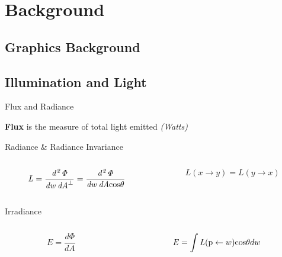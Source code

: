 \documentclass[10pt,handout,compress,professionalfont]{beamer}
\begin{document}
\section{Background}
\subsection{Graphics Background}
\subsection{Illumination and Light}
\begin{frame}{Flux and Radiance}

    {\bf Flux} is the measure of total light emitted \textit{(Watts)}

    \begin{varblock}{Radiance \& Radiance Invariance}
        \begin{columns}
            \begin{column}{0.5\textwidth}
                    \[
                    \mathit{L} = \frac{\mathit{d^{2}\Phi}}{\mathit{dw\:dA}^\perp} = \frac{\mathit{d^{2}\Phi}}{\mathit{dw\:dA}\textup{cos}\theta}
                    \]
            \end{column}
            \begin{column}{0.5\textwidth}
                    \[
                        L(x \to y) = L(y \to x)
                    \]
            \end{column}
        \end{columns}
    \end{varblock}

    \begin{varblock}{Irradiance}
        \begin{columns}
            \begin{column}{0.5\textwidth}
                    \[
                    E = \frac{d\Phi}{dA}
                    \]
            \end{column}
            \begin{column}{0.5\textwidth}
                    \[
                        \mathit{E} = \int\mathit{L}(\textup{p} \leftarrow w)\textup{cos}\theta dw
                    \]
            \end{column}
        \end{columns}
    \end{varblock}



\end{frame}
\end{document}
